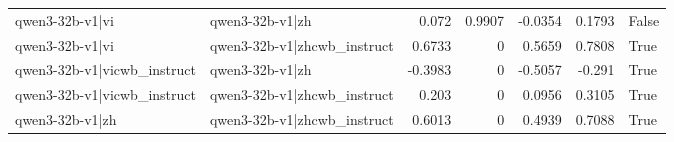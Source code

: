 \begin{table}
\begin{tabular}{l l r r r r l}
qwen3-32b-v1|vi & qwen3-32b-v1|zh & 0.072 & 0.9907 & -0.0354 & 0.1793 & False \\
qwen3-32b-v1|vi & qwen3-32b-v1|zhcwb_instruct & 0.6733 & 0 & 0.5659 & 0.7808 & True \\
qwen3-32b-v1|vicwb_instruct & qwen3-32b-v1|zh & -0.3983 & 0 & -0.5057 & -0.291 & True \\
qwen3-32b-v1|vicwb_instruct & qwen3-32b-v1|zhcwb_instruct & 0.203 & 0 & 0.0956 & 0.3105 & True \\
qwen3-32b-v1|zh & qwen3-32b-v1|zhcwb_instruct & 0.6013 & 0 & 0.4939 & 0.7088 & True \\
\bottomrule
\end{tabular}
\end{table}
